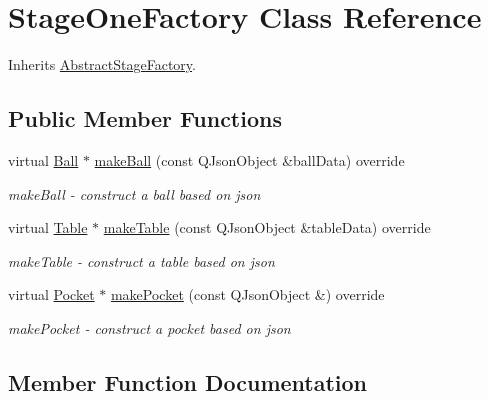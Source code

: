 \hypertarget{class_stage_one_factory}{}\section{Stage\+One\+Factory Class Reference}
\label{class_stage_one_factory}


Inherits \mbox{\hyperlink{class_abstract_stage_factory}{Abstract\+Stage\+Factory}}.

\subsection*{Public Member Functions}
\begin{DoxyCompactItemize}
\item 
virtual \mbox{\hyperlink{class_ball}{Ball}} $\ast$ \mbox{\hyperlink{class_stage_one_factory_a8a89031bc805b70d93e942275777394d}{make\+Ball}} (const Q\+Json\+Object \&ball\+Data) override
\begin{DoxyCompactList}\small\item\em make\+Ball -\/ construct a ball based on json \end{DoxyCompactList}\item 
virtual \mbox{\hyperlink{class_table}{Table}} $\ast$ \mbox{\hyperlink{class_stage_one_factory_a31e02c98e5c428f0e1ac0a36e641310d}{make\+Table}} (const Q\+Json\+Object \&table\+Data) override
\begin{DoxyCompactList}\small\item\em make\+Table -\/ construct a table based on json \end{DoxyCompactList}\item 
virtual \mbox{\hyperlink{class_pocket}{Pocket}} $\ast$ \mbox{\hyperlink{class_stage_one_factory_ab9d7b7d74b61a2fd6c96562a67dc2fe8}{make\+Pocket}} (const Q\+Json\+Object \&) override
\begin{DoxyCompactList}\small\item\em make\+Pocket -\/ construct a pocket based on json \end{DoxyCompactList}\end{DoxyCompactItemize}


\subsection{Member Function Documentation}
\mbox{\label{class_stage_one_factory_a8a89031bc805b70d93e942275777394d}} 
